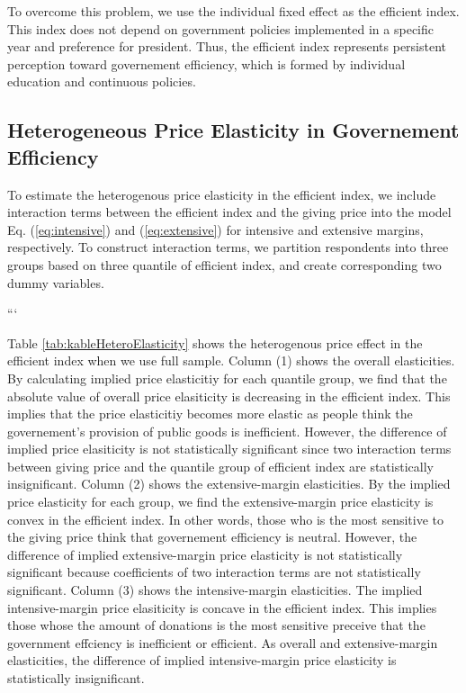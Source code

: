 \documentclass[ review  , 3p ]{elsarticle}
\begin{document}
  To overcome this problem, we use the individual fixed effect as the efficient index.
  This index does not depend on government policies implemented in a specific year and preference for president.
  Thus, the efficient index represents persistent perception toward governement efficiency,
  which is formed by individual education and continuous policies.

  \hypertarget{heterogeneous-price-elasticity-in-governement-efficiency}{%
  \subsection{Heterogeneous Price Elasticity in Governement Efficiency}\label{heterogeneous-price-elasticity-in-governement-efficiency}}

  To estimate the heterogenous price elasticity in the efficient index,
  we include interaction terms between the efficient index and the giving price
  into the model Eq. (\eqref{eq:intensive}) and (\eqref{eq:extensive}) for intensive and extensive margins, respectively.
  To construct interaction terms, we partition respondents into three groups based on three quantile of efficient index,
  and create corresponding two dummy variables.

  ```

  Table \ref{tab:kableHeteroElasticity} shows the heterogenous price effect in the efficient index
  when we use full sample.
  Column (1) shows the overall elasticities.
  By calculating implied price elasticitiy for each quantile group,
  we find that the absolute value of overall price elasiticity is decreasing in the efficient index.
  This implies that the price elasticitiy becomes more elastic
  as people think the governement's provision of public goods is inefficient.
  However,
  the difference of implied price elasiticity is not statistically significant
  since two interaction terms between giving price and the quantile group of efficient index are statistically insignificant.
  Column (2) shows the extensive-margin elasticities.
  By the implied price elasticity for each group,
  we find the extensive-margin price elasticity is convex in the efficient index.
  In other words, those who is the most sensitive to the giving price think that
  governement efficiency is neutral.
  However, the difference of implied extensive-margin price elasticity is not statistically significant
  because coefficients of two interaction terms are not statistically significant.
  Column (3) shows the intensive-margin elasticities.
  The implied intensive-margin price elasiticity is concave in the efficient index.
  This implies those whose the amount of donations is the most sensitive preceive that
  the government effciency is inefficient or efficient.
  As overall and extensive-margin elasticities,
  the difference of implied intensive-margin price elasticity is statistically insignificant.
\end{document}

